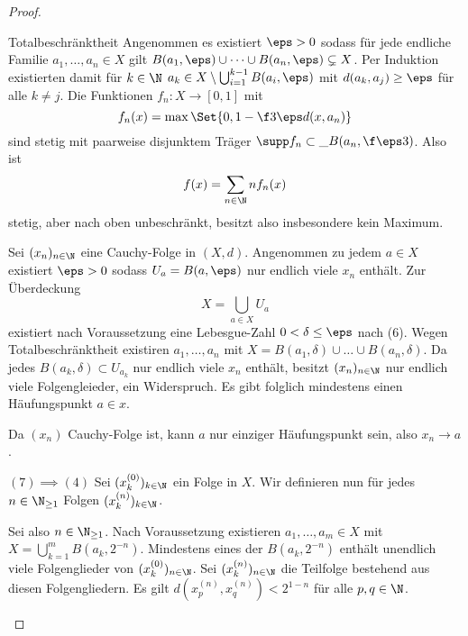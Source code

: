 \begin{st}
\begin{proof}
\begin{seg}[$(5) \implies (6)$]
			\begin{seg}{Totalbeschränktheit}
				Angenommen es existiert $\eps > 0$ sodass für jede endliche Familie $a_1, \dotsc, a_n \in X$ gilt $B(a_1,\eps) \cup \dotsb \cup B(a_n,\eps) \subsetneq X$.
				Per Induktion existierten damit für $k \in \N$ $a_k \in X \setminus \bigcup_{i=1}^{k-1} B(a_i, \eps)$ mit $d(a_k, a_j) \ge \eps$ für alle $k \neq j$.
				Die Funktionen $f_n : X \to [0,1]$ mit
				\[
					f_n(x) = \max \Set{ 0, 1 - \f 3\eps d(x,a_n) }
				\]
				sind stetig mit paarweise disjunktem Träger $\supp f_n \subset \_B(a_n, \f \eps3)$.
				Also ist
				\[
					f(x) = \sum_{n\in \N} n f_n(x)
				\]
				stetig, aber nach oben unbeschränkt, besitzt also insbesondere kein Maximum.
			\end{seg}
		\end{seg}
		\begin{seg}[$(6) \implies (7)$]
			Sei $(x_n)_{n \in \N}$ eine Cauchy-Folge in $(X,d)$.
			Angenommen zu jedem $a \in X$ existiert $\eps > 0$ sodass $U_a = B(a, \eps)$ nur endlich viele $x_n$ enthält.
			Zur Überdeckung
			\[
				X = \bigcup_{a \in X} U_a
			\]
			existiert nach Voraussetzung eine Lebesgue-Zahl $0 < \delta \le \eps$ nach (6).
			Wegen Totalbeschränktheit existiren $a_1, \dotsc, a_n$ mit $X = B(a_1, \delta) \cup \dotsc \cup B(a_n,\delta)$.
			Da jedes $B(a_k,\delta) \subset U_{a_k}$ nur endlich viele $x_n$ enthält, besitzt $(x_n)_{n\in\N}$ nur endlich viele Folgengleieder, ein Widerspruch.
			Es gibt folglich mindestens einen Häufungspunkt $a \in x$.

			Da $(x_n)$ Cauchy-Folge ist, kann $a$ nur einziger Häufungspunkt sein, also $x_n \to a$.
		\end{seg}
		\begin{seg}{$(7) \implies (4)$}
			Sei $(x_k^{(0)})_{k\in\N}$ ein Folge in $X$.
			Wir definieren nun für jedes $n \in \N_{\ge 1}$ Folgen $(x_k^{(n)})_{k\in\N}$.

			Sei also $n \in \N_{\ge 1}$.
			Nach Voraussetzung existieren $a_1, \dotsc, a_m \in X$ mit $X = \bigcup_{k=1}^m B(a_k, 2^{-n})$.
			Mindestens eines der $B(a_k, 2^{-n})$ enthält unendlich viele Folgenglieder von $(x_k^{(0)})_{n\in\N}$.
			Sei $(x_k^{(n)})_{n \in \N}$ die Teilfolge bestehend aus diesen Folgengliedern.
			Es gilt $d(x_p^{(n)}, x_q^{(n)}) < 2^{1-n}$ für alle $p, q \in \N$.


\end{seg}
\end{proof}
\end{st}
